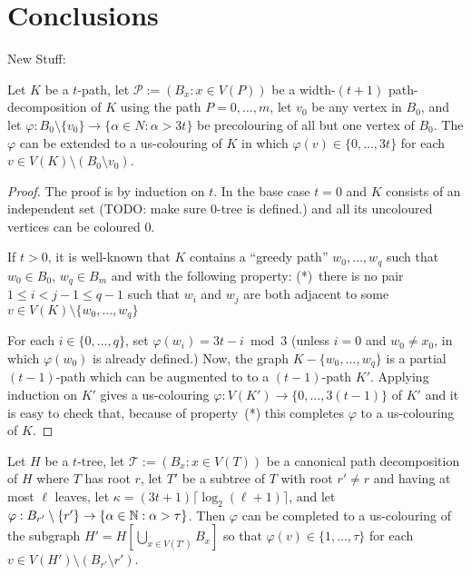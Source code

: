 \documentclass[kpfonts]{patmorin}
\begin{document}
\section{Conclusions}

New Stuff:

\begin{lem}\label{path-colour}
    Let $K$ be a $t$-path, let $\mathcal{P}:=(B_x:x\in V(P))$ be a width-$(t+1)$ path-decomposition of $K$ using the path $P=0,\ldots,m$, let $v_0$ be any vertex in $B_0$, and let $\varphi:B_{0}\setminus\{v_0\}\to\{\alpha\in N:\alpha > 3t\}$ be precolouring of all but one vertex of $B_{0}$.  The $\varphi$ can be extended to a us-colouring of $K$ in which $\varphi(v)\in\{0,\ldots,3t\}$ for each $v\in V(K)\setminus (B_0\setminus v_0)$.
\end{lem}

\begin{proof}
    The proof is by induction on $t$. In the base case $t=0$ and $K$ consists of an independent set (TODO: make sure $0$-tree is defined.) and all its uncoloured vertices can be coloured $0$.

    If $t>0$, it is well-known that $K$ contains a ``greedy path'' $w_0,\ldots,w_q$ such that $w_0\in B_0$, $w_q\in B_m$ and with the following property: (*)~there is no pair $1\le i<j-1\le q-1$ such that $w_i$ and $w_j$ are both adjacent to some $v\in V(K)\setminus \{w_0,\ldots,w_q\}$

    For each $i\in\{0,\ldots,q\}$, set $\varphi(w_i)=3t-i\bmod 3$ (unless $i=0$ and $w_0\neq x_0$, in which $\varphi(w_0)$ is already defined.) Now, the graph $K-\{w_0,\ldots,w_q\}$ is a partial $(t-1)$-path which can be augmented to to a $(t-1)$-path $K'$.  Applying induction on $K'$ gives a us-colouring $\varphi:V(K')\to\{0,\ldots,3(t-1)\}$ of $K'$ and it is easy to check that, because of property~(*) this completes $\varphi$ to a us-colouring of $K$.
\end{proof}

\begin{lem}
    Let $H$ be a $t$-tree, let $\mathcal{T}:=(B_x:x\in V(T))$ be a canonical path decomposition of $H$ where $T$ has root $r$,  let $T'$ be a subtree of $T$ with root $r'\neq r$ and having at most $\ell$ leaves, let $\kappa = (3t+1)\lceil\log_2(\ell+1)\rceil$, and let $\varphi:B_{r'}\setminus\{r'\}\to \{\alpha\in\mathbb{N}: \alpha > \tau\}$.  Then $\varphi$ can be completed to a us-colouring of the subgraph $H'=H[\bigcup_{x\in V(T')}B_x]$ so that $\varphi(v)\in\{1,\ldots,\tau\}$ for each $v\in V(H')\setminus (B_{r'}\setminus r')$.
\end{lem}
\end{document}
